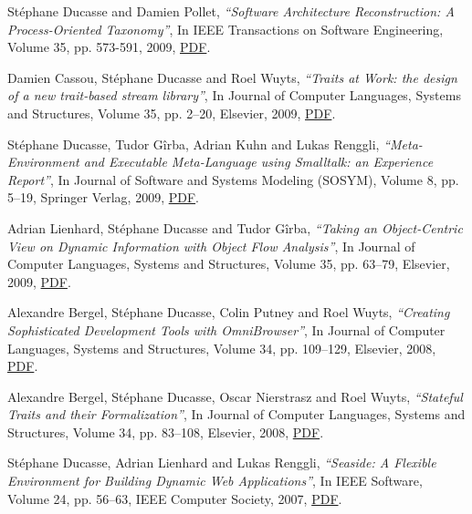 \documentclass{article}
\newcommand{\czauthors}[1]{#1}
\newcommand{\cztitle}[1]{\emph{``#1''}}
\newcommand{\czjournal}[1]{#1}
\begin{document}
\begin{itemize}
	\pub  \czauthors{St\'ephane Ducasse and Damien Pollet},  \cztitle{Software Architecture Reconstruction: A Process-Oriented Taxonomy},  In \czjournal{IEEE Transactions on Software Engineering}, Volume 35, pp. 573-591, 2009, \href{http://rmod-files.lille.inria.fr/Team/Texts/Papers/Duca09c-TSE-SOAArchitectureExtraction.pdf}{PDF}.

	\pub  \czauthors{Damien Cassou, St\'ephane Ducasse and Roel Wuyts},  \cztitle{Traits at Work: the design of a new trait-based stream library},  In \czjournal{Journal of Computer Languages, Systems and Structures}, Volume 35, pp. 2--20, Elsevier, 2009, \href{http://rmod-files.lille.inria.fr/Team/Texts/Papers/Cass08a-ComputerLanguages-NileNewKernel.pdf}{PDF}.

	\pub  \czauthors{St\'ephane Ducasse, Tudor G\^irba, Adrian Kuhn and Lukas Renggli},  \cztitle{Meta-Environment and Executable Meta-Language using {Smalltalk}: an Experience Report},  In \czjournal{Journal of Software and Systems Modeling (SOSYM)}, Volume 8, pp. 5--19, Springer Verlag, 2009, \href{http://rmod-files.lille.inria.fr/Team/Texts/Papers/Duca08a-Sosym-ExecutableMetaLanguage.pdf}{PDF}.

	\pub  \czauthors{Adrian Lienhard, St\'ephane Ducasse and Tudor G\^irba},  \cztitle{Taking an Object-Centric View on Dynamic Information with Object Flow Analysis},  In \czjournal{Journal of Computer Languages, Systems and Structures}, Volume 35, pp. 63--79, Elsevier, 2009, \href{http://rmod-files.lille.inria.fr/Team/Texts/Papers/Lien08cObjectFlowAnalysis.pdf}{PDF}.

	\pub  \czauthors{Alexandre Bergel, St\'ephane Ducasse, Colin Putney and Roel Wuyts},  \cztitle{Creating Sophisticated Development Tools with {OmniBrowser}},  In \czjournal{Journal of Computer Languages, Systems and Structures}, Volume 34, pp. 109--129, Elsevier, 2008, \href{http://rmod-files.lille.inria.fr/Team/Texts/Papers/Berg08d-JComputerLanguage-OmniBrowser.pdf}{PDF}.

	\pub  \czauthors{Alexandre Bergel, St\'ephane Ducasse, Oscar Nierstrasz and Roel Wuyts},  \cztitle{Stateful Traits and their Formalization},  In \czjournal{Journal of Computer Languages, Systems and Structures}, Volume 34, pp. 83--108, Elsevier, 2008, \href{http://rmod-files.lille.inria.fr/Team/Texts/Papers/Berg08e-JournalComputerLanguages-StatefulTraitsFormalization.pdf}{PDF}.

	\pub  \czauthors{St\'ephane Ducasse, Adrian Lienhard and Lukas Renggli},  \cztitle{Seaside: A Flexible Environment for Building Dynamic Web Applications},  In \czjournal{IEEE Software}, Volume 24, pp. 56--63, IEEE Computer Society, 2007, \href{http://rmod-files.lille.inria.fr/Team/Texts/Papers/Duca07a-IEEESoftware-Seaside.pdf}{PDF}.


\end{itemize}
\end{document}
